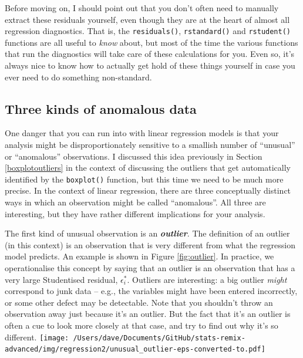\documentclass[
]{book}
\begin{document}
Before moving on, I should point out that you don't often need to manually extract these residuals yourself, even though they are at the heart of almost all regression diagnostics. That is, the \texttt{residuals()}, \texttt{rstandard()} and \texttt{rstudent()} functions are all useful to \emph{know} about, but most of the time the various functions that run the diagnostics will take care of these calculations for you. Even so, it's always nice to know how to actually get hold of these things yourself in case you ever need to do something non-standard.

\hypertarget{regressionoutliers}{%
\subsection{Three kinds of anomalous data}\label{regressionoutliers}}

One danger that you can run into with linear regression models is that your analysis might be disproportionately sensitive to a smallish number of ``unusual'' or ``anomalous'' observations. I discussed this idea previously in Section \ref{boxplotoutliers} in the context of discussing the outliers that get automatically identified by the \texttt{boxplot()} function, but this time we need to be much more precise. In the context of linear regression, there are three conceptually distinct ways in which an observation might be called ``anomalous''. All three are interesting, but they have rather different implications for your analysis.

The first kind of unusual observation is an \textbf{\emph{outlier}}. The definition of an outlier (in this context) is an observation that is very different from what the regression model predicts. An example is shown in Figure \ref{fig:outlier}. In practice, we operationalise this concept by saying that an outlier is an observation that has a very large Studentised residual, \(\epsilon_i^*\). Outliers are interesting: a big outlier \emph{might} correspond to junk data -- e.g., the variables might have been entered incorrectly, or some other defect may be detectable. Note that you shouldn't throw an observation away just because it's an outlier. But the fact that it's an outlier is often a cue to look more closely at that case, and try to find out why it's so different.
\texttt{[image: /Users/dave/Documents/GitHub/stats-remix-advanced/img/regression2/unusual\_outlier-eps-converted-to.pdf]}
\end{document}
